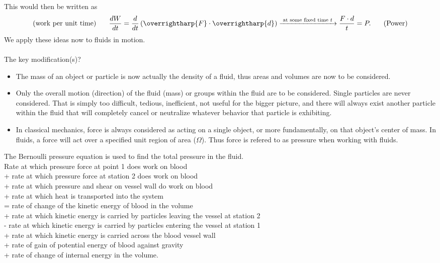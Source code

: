 \documentclass[12pt, a4paper]{article}
\theoremstyle{definition}
\theoremstyle{remark}
\theoremstyle{definition}
\newcommand*{\vtr}[1]{\text{\overrightharp{\ensuremath{#1}}}}
\newcommand{\?}{\stackrel{?}{=}}
\begin{document}
This would then be written as
\begin{align}
{\text{(work per unit time)} \hspace{0.25in} 
\displaystyle\frac{dW}{dt} = 
\frac{d}{dt}\left(\vtr{F} \cdot \vtr{d}\right) 
\xrightarrow{\text{  at some fixed time $t$  }}  
\frac{F\cdot d}{t}} = P. 
\hspace{0.25in} \text{(Power)}
\end{align}
We apply these ideas now to fluids in motion.\\ \\
The key modification(s)?
\begin{itemize}
\item The mass of an object or particle is now actually the density of a fluid, thus areas and volumes are now to be considered.
\item Only the overall motion (direction) of the fluid (mass) or groups within the fluid are to be considered. Single particles are never considered. That is simply too difficult, tedious, inefficient, not useful for the bigger picture, and there will always exist another particle within the fluid that will completely cancel or neutralize whatever behavior that particle is exhibiting. 
\item In classical mechanics, force is always considered as acting on a single object, or more fundamentally, on that object's center of mass. In fluids, a force will act over a specified unit region of area ($\Omega$). Thus force is refered to as pressure when working with fluids. \\
\end{itemize}
The Bernoulli pressure equation is used to find the total pressure in the fluid. \\

\noindent Rate at which pressure force at point 1 does work on blood\\
+ rate at which pressure force at station 2 does work on blood\\
+ rate at which pressure and shear on vessel wall do work on blood\\
+ rate at which heat is transported into the system\\
= rate of change of the kinetic energy of blood in the volume \\
+ rate at which kinetic energy is carried by particles leaving the vessel at station 2 \\
- rate at which kinetic energy is carried by particles entering the vessel at station 1 \\
+ rate at which kinetic energy is carried across the blood vessel wall \\
+ rate of gain of potential energy of blood against gravity \\
+ rate of change of internal energy in the volume. \\
\end{document}
